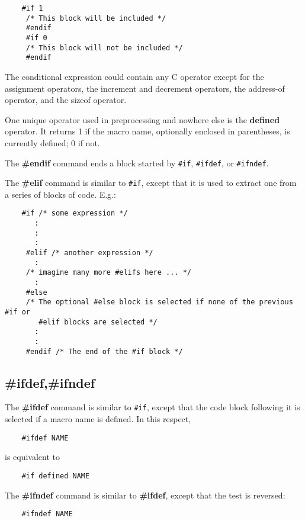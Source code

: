 \begin{verbatim}
	#if 1
	 /* This block will be included */
	 #endif
	 #if 0
	 /* This block will not be included */
	 #endif
\end{verbatim}

The conditional expression could contain any C operator except for the assignment operators, the increment and decrement operators, the address-of operator, and the sizeof operator.

One unique operator used in preprocessing and nowhere else is the \textbf{defined} operator. It returns 1 if the macro name, optionally enclosed in parentheses, is currently defined; 0 if not.

The \textbf{\#endif} command ends a block started by \texttt{\#if}, \texttt{\#ifdef}, or \texttt{\#ifndef}.

The \textbf{\#elif} command is similar to \texttt{\#if}, except that it is used to extract one from a series of blocks of code. E.g.:

\begin{verbatim}
	#if /* some expression */
	   :
	   :
	   :
	 #elif /* another expression */
	   :
	 /* imagine many more #elifs here ... */
	   :
	 #else
	 /* The optional #else block is selected if none of the previous #if or
	    #elif blocks are selected */
	   :
	   :
	 #endif /* The end of the #if block */
\end{verbatim}

\subsection{\#ifdef,\#ifndef}

The \textbf{\#ifdef} command is similar to \texttt{\#if}, except that the code block following it is selected if a macro name is defined. In this respect,

\begin{verbatim}
	#ifdef NAME
\end{verbatim}

is equivalent to

\begin{verbatim}
	#if defined NAME
\end{verbatim}

The \textbf{\#ifndef} command is similar to \textbf{\#ifdef}, except that the test is reversed:

\begin{verbatim}
	#ifndef NAME
\end{verbatim}

